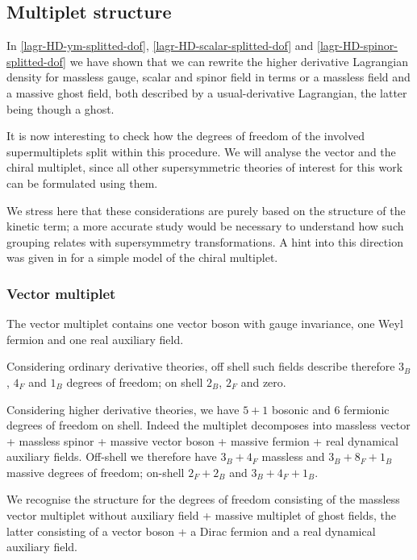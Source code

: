 \subsection{Multiplet structure}

In \eqref{lagr-HD-ym-splitted-dof}, \eqref{lagr-HD-scalar-splitted-dof} and \eqref{lagr-HD-spinor-splitted-dof} we have shown that we can rewrite the higher derivative Lagrangian density for massless gauge, scalar and spinor field in terms or a massless field and a massive ghost field, both described by a usual-derivative Lagrangian, the latter being though a ghost.


It is now interesting to check how the degrees of freedom of the involved supermultiplets split within this procedure.
We will analyse the vector and the chiral multiplet, since all other supersymmetric theories of interest for this work can be formulated using them.


We stress here that these  considerations are purely based on the structure of the kinetic term; a more accurate study would be necessary to understand how such grouping relates with supersymmetry transformations.
A hint into this direction was given in \cite{Ferrara:1977mv} for a simple model of the chiral multiplet.


\subsubsection{Vector multiplet}

The vector multiplet contains one vector boson with gauge invariance, one Weyl fermion and one real auxiliary field.

Considering ordinary derivative theories, off shell such fields describe therefore $3_B$, $4_F$ and $1_B$ degrees of freedom; on shell $2_B$, $2_F$ and zero.

Considering higher derivative theories, we have $5+1$ bosonic and $6$ fermionic degrees of freedom on shell. Indeed the multiplet decomposes into massless vector + massless spinor  + massive vector boson + massive fermion + real dynamical auxiliary fields. Off-shell we therefore have $3_B + 4_F$ massless and $3_B + 8_F + 1_B$ massive degrees of freedom; on-shell $2_F + 2_B $ and $3_B + 4_F + 1_B$.

We recognise the structure for the degrees of freedom consisting of the massless vector multiplet without auxiliary field + massive multiplet of ghost fields, the latter consisting of a vector boson + a Dirac fermion and a real dynamical auxiliary field.



